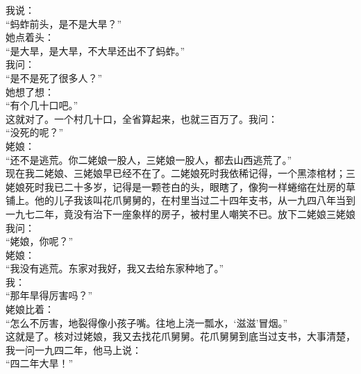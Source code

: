 我说：\\

“蚂蚱前头，是不是大旱？”\\

她点着头：\\

“是大旱，是大旱，不大旱还出不了蚂蚱。”\\

我问：\\

“是不是死了很多人？”\\

她想了想：\\

“有个几十口吧。”\\

这就对了。一个村几十口，全省算起来，也就三百万了。我问：\\

“没死的呢？”\\

姥娘：\\

“还不是逃荒。你二姥娘一股人，三姥娘一股人，都去山西逃荒了。”\\

现在我二姥娘、三姥娘早已经不在了。二姥娘死时我依稀记得，一个黑漆棺材；三姥娘死时我已二十多岁，记得是一颗苍白的头，眼瞎了，像狗一样蜷缩在灶房的草铺上。他的儿子我该叫花爪舅舅的，在村里当过二十四年支书，从一九四八年当到一九七二年，竟没有治下一座象样的房子，被村里人嘲笑不已。放下二姥娘三姥娘我问：\\

“姥娘，你呢？”\\

姥娘：\\

“我没有逃荒。东家对我好，我又去给东家种地了。”\\

我：\\

“那年旱得厉害吗？”\\

姥娘比着：\\

“怎么不厉害，地裂得像小孩子嘴。往地上浇一瓢水，‘滋滋’冒烟。”\\

这就是了。核对过姥娘，我又去找花爪舅舅。花爪舅舅到底当过支书，大事清楚，我一问一九四二年，他马上说：\\

“四二年大旱！”\\

